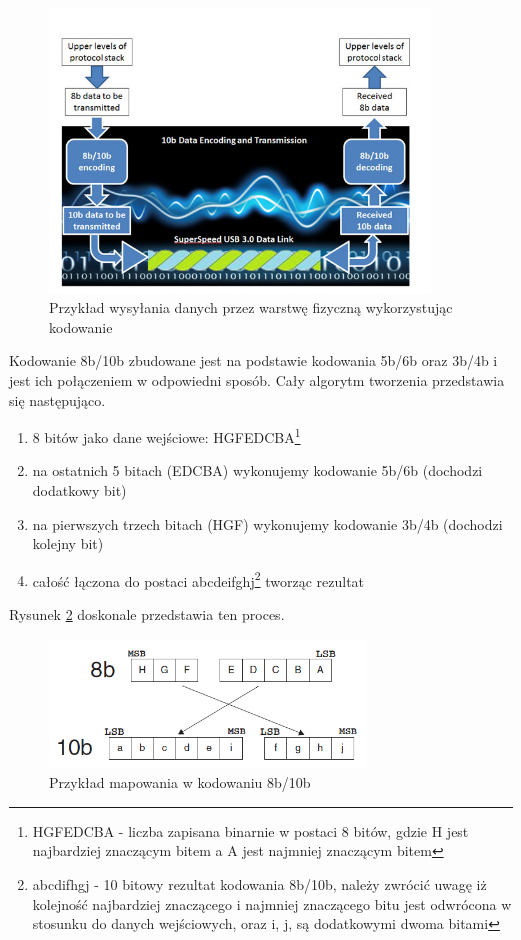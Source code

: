 \documentclass{BscUS}
\begin{document}
\begin{figure}[H]
\centering
\includegraphics[width=0.9\textwidth]{./img/SendingData}
\caption{Przykład wysyłania danych przez warstwę fizyczną wykorzystując kodowanie \cite{SendingData}}
\label{fig:sendingDataThroughPHYLayer}
\end{figure}
Kodowanie 8b/10b zbudowane jest na podstawie kodowania 5b/6b oraz 3b/4b i jest ich połączeniem w odpowiedni sposób. Cały algorytm tworzenia przedstawia się następująco.
\begin{enumerate}
\item 8 bitów jako dane wejściowe: HGFEDCBA\footnote{HGFEDCBA - liczba zapisana binarnie w postaci 8 bitów, gdzie H jest najbardziej znaczącym bitem a A jest najmniej znaczącym bitem}
\item na ostatnich 5 bitach (EDCBA) wykonujemy kodowanie 5b/6b (dochodzi dodatkowy bit)
\item na pierwszych trzech bitach (HGF) wykonujemy kodowanie 3b/4b (dochodzi kolejny bit)
\item całość łączona do postaci abcdeifghj\footnote{abcdifhgj - 10 bitowy rezultat kodowania 8b/10b, należy zwrócić uwagę iż kolejność najbardziej znaczącego i najmniej znaczącego bitu jest odwrócona w stosunku do danych wejściowych, oraz i, j, są dodatkowymi dwoma bitami} tworząc rezultat
\end{enumerate}
Rysunek \ref{fig:810mapping} doskonale przedstawia ten proces.
\begin{figure}[H]
\centering
\includegraphics[width=0.75\textwidth]{./img/mapping810}
\caption{Przykład mapowania w kodowaniu 8b/10b \cite{mapping810}}
\label{fig:810mapping}
\end{figure}
\end{document}

